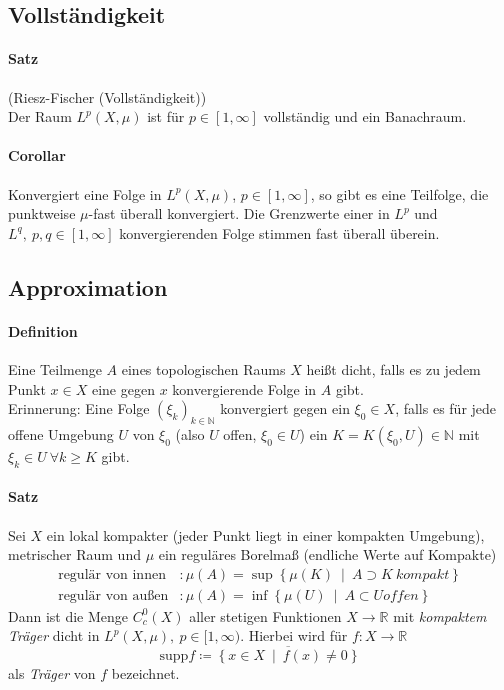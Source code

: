 \documentclass[12pt,a4paper,fleqn]{article}
\def\set#1{{\left\{ #1 \right\}}}
\def\Mid{\ \middle|\ }
\begin{document}
\subsection{Vollständigkeit}

\paragraph{Satz} (Riesz-Fischer (Vollständigkeit))\\
Der Raum ${L}^p(X, \mu)$ ist für $p \in [1, \infty]$ vollständig und ein Banachraum.

\paragraph{Corollar} Konvergiert eine Folge in ${L}^p(X, \mu)$, $p \in [1, \infty]$, so gibt es eine Teilfolge, die punktweise $\mu$-fast überall konvergiert. Die Grenzwerte einer in ${L}^p$ und \mbox{${L}^q,\ p, q \in [1, \infty]$} konvergierenden Folge stimmen fast überall überein.

\subsection{Approximation}

\paragraph{Definition} Eine Teilmenge $A$ eines topologischen Raums $X$ heißt dicht, falls es zu jedem Punkt $x \in X$ eine gegen $x$ konvergierende Folge in $A$ gibt.\\
Erinnerung: Eine Folge $(\xi_k)_{k \in \mathbb{N}}$ konvergiert gegen ein $\xi_0 \in X$, falls es für jede offene Umgebung $U$ von $\xi_0$ (also $U$ offen, $\xi_0 \in U$) ein $K = K(\xi_0, U) \in \mathbb{N}$ mit $\xi_k \in U\ \forall k \geq K$ gibt.

\paragraph{Satz} Sei $X$ ein lokal kompakter (jeder Punkt liegt in einer kompakten Umgebung), metrischer Raum und $\mu$ ein reguläres Borelmaß (endliche Werte auf Kompakte)
\begin{align*}
\text{regulär von innen}&\colon \mu(A) = \sup \set{\mu(K) \Mid A \supset K\ kompakt}\\
\text{regulär von außen}&\colon \mu(A) = \inf \set{\mu(U) \Mid A \subset U \mathit{offen}}
\end{align*}
Dann ist die Menge $C^0_c(X)$ aller stetigen Funktionen $X \rightarrow \mathbb{R}$ mit \textit{kompaktem Träger} dicht in $L^p(X, \mu),\ p \in [1, \infty)$. Hierbei wird für $f\colon X \rightarrow\mathbb{R}$
\begin{displaymath}
\text{supp} f \coloneqq \overline{\set{x \in X \Mid f(x) \not = 0}}
\end{displaymath}
als \textit{Träger} von $f$ bezeichnet.
\end{document}
